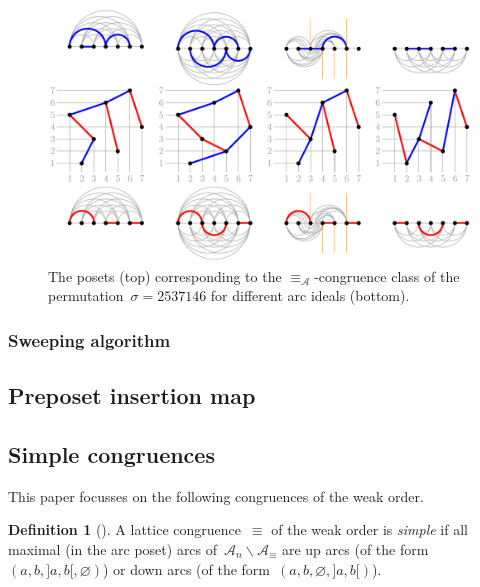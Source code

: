 \documentclass{amsart}
\theoremstyle{definition}
\newtheorem{definition}[theorem]{Definition}
\newcommand{\ssm}{\smallsetminus} %
\newcommand{\darkblue}{\color{darkblue}} %
\newcommand{\defn}[1]{\textsl{\darkblue #1}} %
\newcommand{\vincent}[1]{\todo[color=blue!30]{#1 \\ \hfill --- V.}}
\newcommand{\arcs}{{\mathcal{A}}} %
\begin{document}
\begin{figure}
	\capstart
	\centerline{\includegraphics[scale=.85]{arcDiagramsQuotients}}
	\caption{The posets (top) corresponding to the $\equiv_\arcs$-congruence class of the permutation~$\sigma = 2537146$ for different arc ideals (bottom).}
	\label{fig:arcDiagramsQuotients}
\end{figure}

\subsubsection{Sweeping algorithm}
\vincent{todo}


\subsection{Preposet insertion map}
\label{subsec:insertionMap}



\subsection{Simple congruences}
\label{subsec:simpleCongruences}

This paper focusses on the following congruences of the weak order.

\begin{definition}[{\cite[Sect.~4.4]{HoangMutze}}]
\label{def:simpleCongruence}
A lattice congruence~$\equiv$ of the weak order is \defn{simple} if all maximal (in the arc poset) arcs of~$\arcs_n \ssm \arcs_\equiv$ are up arcs (of the form~$(a, b, {]a,b[}, \varnothing)$) or down arcs (of the form~$(a, b, \varnothing, {]a,b[})$).
\end{definition}
\end{document}
